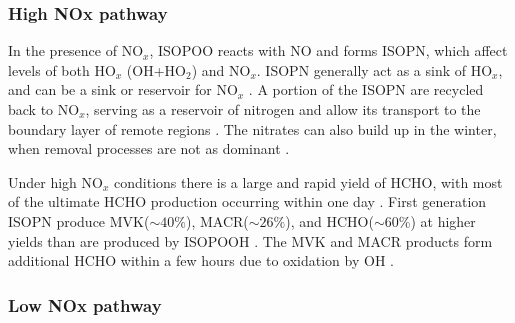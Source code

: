     
      
      
    \subsubsection{High NOx pathway}
      In the presence of NO$_x$, ISOPOO reacts with NO and forms ISOPN, which affect levels of both HO$_x$ (OH+HO$_2$) and NO$_x$.
      ISOPN generally act as a sink of HO$_x$, and can be a sink or reservoir for NO$_x$ \parencite[][]{Mao2013,Fisher2016}. 
      A portion of the ISOPN are recycled back to NO$_x$, serving as a reservoir of nitrogen and allow its transport to the boundary layer of remote regions \parencite{Patchen2007,Paulot2009a}.
      The nitrates can also build up in the winter, when removal processes are not as dominant \parencite{Lelieveld2009}.
      
      Under high NO$_x$ conditions there is a large and rapid yield of HCHO, with most of the ultimate HCHO production occurring within one day \parencite{Palmer2006}.
      First generation ISOPN produce MVK($\sim 40\%$), MACR($\sim 26\%$), and HCHO($\sim 60\%$) at higher yields than are produced by ISOPOOH \parencite{Liu2013,Mao2013}.
      The MVK and MACR products form additional HCHO within a few hours due to oxidation by OH \parencite{Palmer2006}.
      
      
      
    
    \subsubsection{Low NOx pathway}
      
